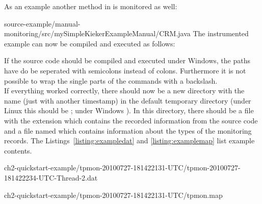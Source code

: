 As an example another method in  is monitored as well:

\setJavaCodeListing
%
{source-example/manual-monitoring/src/mySimpleKiekerExampleManual/CRM.java}
The instrumented example can now be compiled and executed as follows:

\setBashListing 		
			

\warning If the source code should be compiled and executed under Windows, the %
paths have do be seperated with semicolons instead of colons. Furthermore it is %
not possible to wrap the single parts of the commands with a backslash.\\
If everything worked correctly, there should now be a new directory with the %
name  (just with another timestamp) in the default %
temporary directory (under Linux this should be ; under Windows %
). In this directory, there should be a file with the extension %
 which contains the recorded information from the source code and %
a file named  which contains information about the types of the %
monitoring records. %
The Listings~\ref{listing:exampledat} and \ref{listing:examplemap} list example %
contents. 


\setBashListing
%
{ch2-quickstart-example/tpmon-20100727-181422131-UTC/tpmon-20100727-181422234-UTC-Thread-2.dat}

%
{ch2-quickstart-example/tpmon-20100727-181422131-UTC/tpmon.map}


